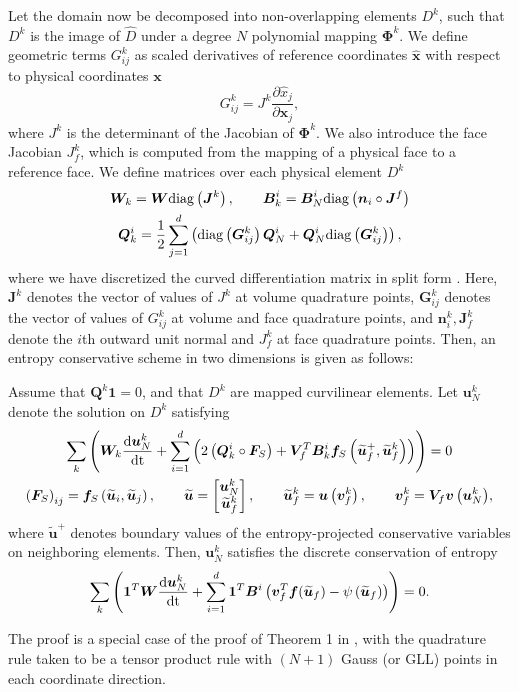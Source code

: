 \documentclass[review,onefignum,onetabnum,final]{siamart171218}
\renewcommand{\tilde}{\widetilde}
\renewcommand{\hat}{\widehat}
\newcommand{\td}[2]{\frac{{\rm d}#1}{{\rm d}{\rm #2}}}
\newcommand{\pd}[2]{\frac{\partial#1}{\partial#2}}
\newcommand{\LRp}[1]{\left( #1 \right)}
\newcommand{\diag}[1]{{\rm diag}\LRp{#1}}
\begin{document}
Let the domain now be decomposed into non-overlapping elements $D^k$, such that $D^k$ is the image of $\hat{D}$ under a degree $N$ polynomial mapping $\bm{\Phi}^k$.  We define geometric terms ${G}^k_{ij}$ as scaled derivatives of reference coordinates $\hat{\bm{x}}$ with respect to physical coordinates $\bm{x}$
\[
{G}^k_{ij} = J^k\pd{\hat{x}_j}{\bm{x}_j},
\]
where $J^k$ is the determinant of the Jacobian of $\bm{\Phi}^k$.  We also introduce the face Jacobian $J^k_f$, which is computed from the mapping of a physical face to a reference face.  We define matrices over each physical element $D^k$ 
\begin{gather}
\bm{W}_k = \bm{W} \diag{\bm{J}^k}, \qquad \bm{B}^i_k = \bm{B}^i_N \diag{\bm{n}_i \circ\bm{J}^f } \nonumber\\
\bm{Q}^i_k = \frac{1}{2} \sum_{j=1}^d \LRp{\diag{{\bm{G}}^k_{ij}}\bm{Q}^i_N  + \bm{Q}^i_N \diag{{\bm{G}}^k_{ij}} } \label{eq:splitcurv},
\end{gather}
where we have discretized the curved differentiation matrix in split form \cite{nordstrom2006conservative}.  
Here, $\bm{J}^k$ denotes the vector of values of $J^k$ at volume quadrature points, ${\bm{G}}^k_{ij}$ denotes the vector of values of ${G}^k_{ij}$ at volume and face quadrature points, and $\bm{n}^k_i, \bm{J}^k_f$ denote the $i$th outward unit normal and $J^k_f$ at face quadrature points.  Then, an entropy conservative scheme in two dimensions is given as follows: 
\begin{theorem}
\label{thm:esdg2d}
Assume that $\bm{Q}^k\bm{1} = 0$, and that $D^k$ are mapped curvilinear elements.  Let $\bm{u}^k_N$ denote the solution on $D^k$ satisfying
\begin{gather*}
\sum_{k}\LRp{\bm{W}_k\td{\bm{u}^k_N}{t} + \sum_{i=1}^d \LRp{2\LRp{\bm{Q}^i_k\circ\bm{F}_S} + \bm{V}_f^T\bm{B}_k^i\bm{f}_S\LRp{{\tilde{\bm{u}}_f}^+,\tilde{\bm{u}}^k_f}}} = 0\\
\LRp{\bm{F}_S}_{ij} = \bm{f}_S\LRp{\tilde{\bm{u}}_i,\tilde{\bm{u}}_j}, \qquad \tilde{\bm{u}} = \begin{bmatrix}
\bm{u}^k_N\\
\tilde{\bm{u}}^k_f
\end{bmatrix}, \qquad \tilde{\bm{u}}^k_f = \bm{u}\LRp{\bm{v}^k_f}, \qquad 
\bm{v}^k_f = {\bm{V}_f\bm{v}\LRp{\bm{u}^k_N}},
\end{gather*}
where $\tilde{\bm{u}}^+$ denotes boundary values of the entropy-projected conservative variables on neighboring elements.  Then, $\bm{u}^k_N$ satisfies the discrete conservation of entropy 
\[
\sum_{k} \LRp{\bm{1}^T\bm{W}\td{\bm{u}^k_N}{t} + \sum_{i=1}^d\bm{1}^T\bm{B}^i\LRp{\bm{v}_f^T\bm{f}(\tilde{\bm{u}}_f) - \psi\LRp{\tilde{\bm{u}}_f}}} = 0.
\]
\end{theorem}
The proof is a special case of the proof of Theorem 1 in \cite{chan2018discretely}, with the quadrature rule taken to be a tensor product rule with $(N+1)$ Gauss (or GLL) points in each coordinate direction.  
\end{document}
